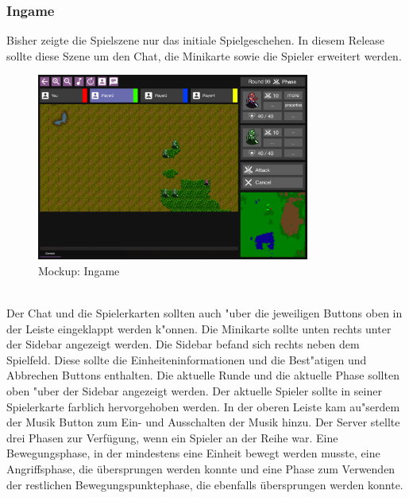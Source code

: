 \documentclass[12pt, titlepage]{scrartcl}
\newcounter{subsubsubsection}[subsubsection]
\begin{document}
		    \subsubsection{Ingame}
		        Bisher zeigte die Spielszene nur das initiale Spielgeschehen. In diesem Release sollte diese Szene um den Chat, die Minikarte sowie die Spieler erweitert werden. \\
		        \begin{figure}[H] 
    				\centering
    				\includegraphics[width=0.8\textwidth]{images/mockups/Ingame.png}
    				\caption{Mockup: Ingame}
    				\label{Ingame_View}
			    \end{figure}
		    	\ \\   Der Chat und die Spielerkarten sollten auch "uber die jeweiligen Buttons oben in der Leiste eingeklappt werden k"onnen. Die Minikarte sollte unten rechts unter der Sidebar angezeigt werden. Die Sidebar befand sich rechts neben dem Spielfeld. Diese sollte die Einheiteninformationen und die Best"atigen und Abbrechen Buttons enthalten. Die aktuelle Runde und die aktuelle Phase sollten oben "uber der Sidebar angezeigt werden. Der aktuelle Spieler sollte in seiner Spielerkarte farblich hervorgehoben werden. In der oberen Leiste kam au"serdem der Musik Button zum Ein- und Ausschalten der Musik hinzu.
			        Der Server stellte drei Phasen zur Verf\"ugung, wenn ein Spieler an der Reihe war. Eine Bewegungsphase, in der mindestens eine Einheit bewegt werden musste, eine Angriffsphase, die \"ubersprungen werden konnte und eine Phase zum Verwenden der restlichen Bewegungspunktephase, die ebenfalls \"ubersprungen werden konnte. \\
\end{document}
